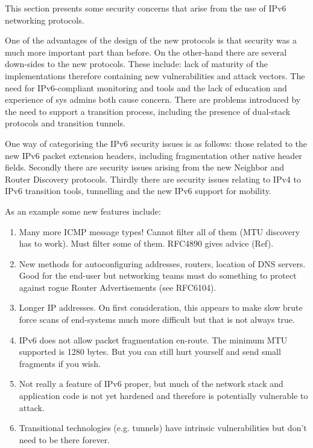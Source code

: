 This section presents some security concerns that arise from the use of IPv6 networking protocols. 

One of the advantages of the design of the new protocols is that security was a much more important part than before. On the other-hand there are several down-sides to the new protocols. These include: lack of maturity of the implementations therefore containing new vulnerabilities and attack vectors. The need for IPv6-compliant monitoring and tools and the lack of education and experience of sys admins both cause concern. There are problems introduced by the need to support a transition process, including the presence of dual-stack protocols and transition tunnels.

One way of categorising the IPv6 security issues is as follows: those related to the new IPv6 packet extension headers, including fragmentation other native header fields. Secondly there are security issues arising from the new Neighbor and Router Discovery protocols. Thirdly there are security issues relating to IPv4 to IPv6 transition tools, tunnelling and the new IPv6 support for mobility.

As an example some new features include:

\begin{enumerate}

\item Many more ICMP message types! Cannot filter all of them (MTU discovery has to work). Must filter some of them. RFC4890 gives advice (Ref).

\item New methods for autoconfiguring addresses, routers, location of DNS servers. Good for the end-user but networking teams must do something to protect against rogue Router Advertisements (see RFC6104).

\item Longer IP addresses. On first consideration, this appears to make slow brute force scans of end-systems much more difficult but that is not always true. 

\item IPv6 does not allow packet fragmentation en-route.  The minimum MTU supported is 1280 bytes. But you can still hurt yourself and send small fragments if you wish. 

\item Not really a feature of IPv6 proper, but much of the network stack and application code is not yet hardened and therefore is potentially vulnerable to attack.

\item Transitional technologies (e.g. tunnels) have intrinsic vulnerabilities but don't need to be there forever.

\end{enumerate}

